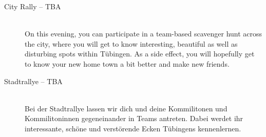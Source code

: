 \begin{description}

\ifml
	\item[City Rally -- TBA]~\\
	On this evening, you can participate in a team-based scavenger hunt across the city,
	where you will get to know interesting, beautiful as well as disturbing spots within Tübingen.
	As a side effect, you will hopefully get to know your new home town a bit better and make new friends.
\else
	\item[Stadtrallye -- TBA]~\\
	Bei der Stadtrallye lassen wir dich und deine Kommilitonen und Kommilitoninnen gegeneinander in Teams antreten.
	Dabei werdet ihr interessante, schöne und verstörende Ecken Tübingens kennenlernen.
\fi




\end{description}
